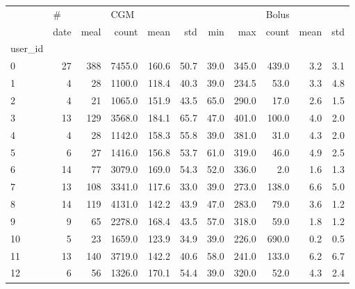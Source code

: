 \begin{tabular}{lrrrrrrrrrr}
\toprule
{} & \multicolumn{2}{l}{\#} & \multicolumn{5}{l}{CGM} & \multicolumn{3}{l}{Bolus} \\
{} & date & meal &   count &   mean &   std &   min &    max &  count & mean &  std \\
user\_id &      &      &         &        &       &       &        &        &      &      \\
\midrule
0       &   27 &  388 &  7455.0 &  160.6 &  50.7 &  39.0 &  345.0 &  439.0 &  3.2 &  3.1 \\
1       &    4 &   28 &  1100.0 &  118.4 &  40.3 &  39.0 &  234.5 &   53.0 &  3.3 &  4.8 \\
2       &    4 &   21 &  1065.0 &  151.9 &  43.5 &  65.0 &  290.0 &   17.0 &  2.6 &  1.5 \\
3       &   13 &  129 &  3568.0 &  184.1 &  65.7 &  47.0 &  401.0 &  100.0 &  4.0 &  2.0 \\
4       &    4 &   28 &  1142.0 &  158.3 &  55.8 &  39.0 &  381.0 &   31.0 &  4.3 &  2.0 \\
5       &    6 &   27 &  1416.0 &  156.8 &  53.7 &  61.0 &  319.0 &   46.0 &  4.9 &  2.5 \\
6       &   14 &   77 &  3079.0 &  169.0 &  54.3 &  52.0 &  336.0 &    2.0 &  1.6 &  1.3 \\
7       &   13 &  108 &  3341.0 &  117.6 &  33.0 &  39.0 &  273.0 &  138.0 &  6.6 &  5.0 \\
8       &   14 &  119 &  4131.0 &  142.2 &  43.9 &  47.0 &  283.0 &   79.0 &  3.6 &  1.2 \\
9       &    9 &   65 &  2278.0 &  168.4 &  43.5 &  57.0 &  318.0 &   59.0 &  1.8 &  1.2 \\
10      &    5 &   23 &  1659.0 &  123.9 &  34.9 &  39.0 &  226.0 &  690.0 &  0.2 &  0.5 \\
11      &   13 &  140 &  3719.0 &  142.2 &  40.6 &  58.0 &  241.0 &  133.0 &  6.2 &  6.7 \\
12      &    6 &   56 &  1326.0 &  170.1 &  54.4 &  39.0 &  320.0 &   52.0 &  4.3 &  2.4 \\
\bottomrule
\end{tabular}
